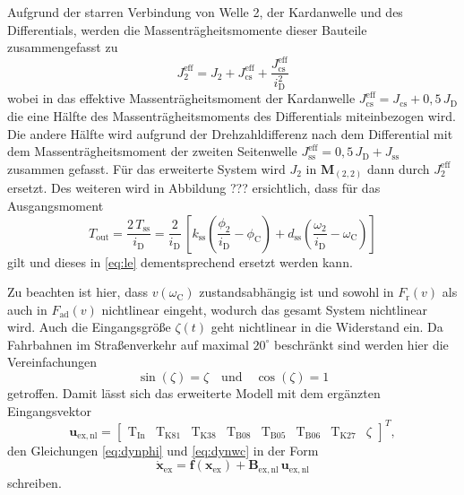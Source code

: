 Aufgrund der starren Verbindung von Welle 2, der Kardanwelle und des Differentials, werden die Massenträgheitsmomente dieser Bauteile zusammengefasst zu
\begin{equation}
J^\mathrm{eff}_2 = J_2 + J^\mathrm{eff}_\mathrm{cs} + \frac{J^\mathrm{eff}_\mathrm{cs}}{i_\mathrm{D}^2}
\end{equation}
wobei in das effektive Massenträgheitsmoment der Kardanwelle $J^\mathrm{eff}_\mathrm{cs} = J_\mathrm{cs} + 0,5\,J_\mathrm{D}$ die eine Hälfte des Massenträgheitsmoments des Differentials miteinbezogen wird. Die andere Hälfte wird aufgrund der Drehzahldifferenz nach dem Differential mit dem Massenträgheitsmoment der zweiten Seitenwelle $J^\mathrm{eff}_\mathrm{ss} =  0,5\,J_\mathrm{D} + J_\mathrm{ss}$ zusammen gefasst. Für das erweiterte System wird $J_2$ in $\pmb{M}_(2,2)$ dann durch $J^\mathrm{eff}_2$ ersetzt. Des weiteren wird in Abbildung ??? ersichtlich, dass für das Ausgangsmoment 
\begin{equation}
T_\mathrm{out} = \frac{2\,T_\mathrm{ss}}{i_\mathrm{D}} = \frac{2}{i_\mathrm{D}}\,\left[ k_\mathrm{ss}\left(\frac{\phi_2}{i_{\mathrm{D}}} - \phi_\mathrm{C}\right) + d_\mathrm{ss}\left(\frac{\omega_2}{i_{\mathrm{D}}} - \omega_\mathrm{C}\right)\right]
\end{equation}
gilt und dieses in \eqref{eq:le} dementsprechend ersetzt werden kann.

Zu beachten ist hier, dass $v(\omega_\mathrm{C})$ zustandsabhängig ist und sowohl in $F_\mathrm{r}(v)$ als auch in $F_\mathrm{ad}(v)$ nichtlinear eingeht, wodurch das gesamt System nichtlinear wird. Auch die Eingangsgröße $\zeta(t)$ geht nichtlinear in die Widerstand ein. Da Fahrbahnen im Straßenverkehr auf maximal $20^\circ$ beschränkt sind werden hier die Vereinfachungen
\begin{equation}
\sin(\zeta) = \zeta \quad \mathrm{und} \quad \cos(\zeta) = 1
\end{equation}  
getroffen. Damit lässt sich das erweiterte Modell mit dem ergänzten Eingangsvektor
\begin{equation}\label{eq:uex}
\pmb{u}_\mathrm{ex,nl} = \begin{bmatrix} \mathrm{T}_{\mathrm{In}} & \mathrm{T}_{\mathrm{K81}} & \mathrm{T}_{\mathrm{K38}} & \mathrm{T}_{\mathrm{B08}} & \mathrm{T}_{\mathrm{B05}} & \mathrm{T}_{\mathrm{B06}} & \mathrm{T}_{\mathrm{K27}} & \zeta \end{bmatrix}^T,
\end{equation}
den Gleichungen \eqref{eq:dynphi} und \eqref{eq:dynwc} in der Form 
\begin{equation}
\dot{\pmb{x}}_\mathrm{ex} = \pmb{f}(\pmb{x}_\mathrm{ex}) + \pmb{B}_\mathrm{ex,nl}\,\pmb{u}_\mathrm{ex,nl}
\end{equation}
schreiben.

